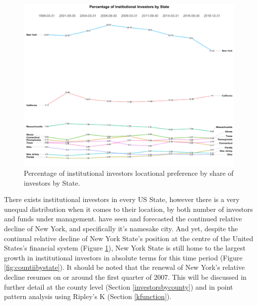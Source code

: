 \begin{figure}[ht]
	\centering
	\includegraphics[width=\linewidth]{Figures/ChapterIII/Precentage_State}
	\caption[Percentage of Investor by State]{Percentage of institutional investors locational preference by share of investors by State.}
	\label{fig:precentagestate}
\end{figure}
There exists institutional investors in every US State, however there is a very unequal distribution when it comes to their location, by both number of investors and funds under management. \cite{WheelerMitchelson89,Green1995,bodenmanfirm2000, Graves2003} have seen and forecasted the continued relative decline of New York, and specifically it's namesake city.  And yet, despite the continual relative decline of New York State's position at the centre of the United States's financial system (Figure \ref{fig:precentagestate}), New York State is still home to the largest growth in institutional investors in absolute terms for this time period (Figure \ref{fig:countiibystate}). It should be noted that the renewal of New York's relative decline resumes on or around the first quarter of 2007.  This will be discussed in further detail at the county level (Section \ref{investorsbycounty}) and in point pattern analysis using Ripley's K (Section \ref{kfunction}).  	

